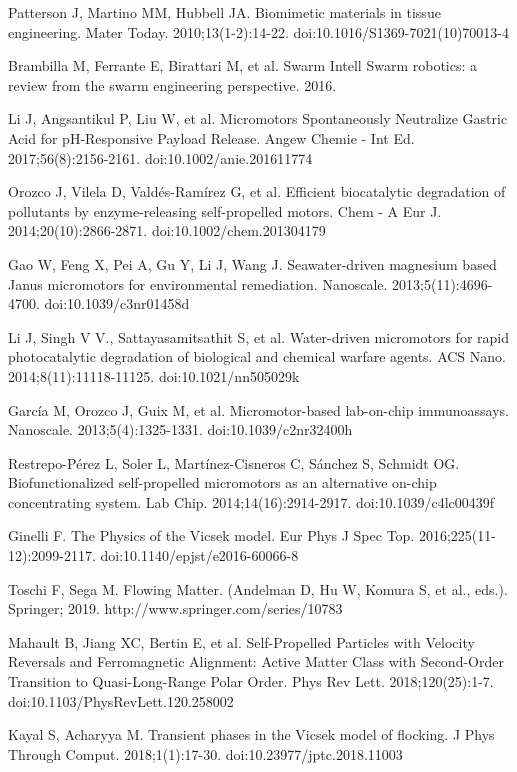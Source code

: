 \documentclass[11pt]{article}
\begin{document}
\begin{thebibliography}{9}
Patterson J, Martino MM, Hubbell JA. Biomimetic materials in tissue engineering. Mater Today. 2010;13(1-2):14-22. doi:10.1016/S1369-7021(10)70013-4

Brambilla M, Ferrante E, Birattari M, et al. Swarm Intell Swarm robotics: a review from the swarm engineering perspective. 2016.

Li J, Angsantikul P, Liu W, et al. Micromotors Spontaneously Neutralize Gastric Acid for pH-Responsive Payload Release. Angew Chemie - Int Ed. 2017;56(8):2156-2161. doi:10.1002/anie.201611774

Orozco J, Vilela D, Valdés-Ramírez G, et al. Efficient biocatalytic degradation of pollutants by enzyme-releasing self-propelled motors. Chem - A Eur J. 2014;20(10):2866-2871. doi:10.1002/chem.201304179

Gao W, Feng X, Pei A, Gu Y, Li J, Wang J. Seawater-driven magnesium based Janus micromotors for environmental remediation. Nanoscale. 2013;5(11):4696-4700. doi:10.1039/c3nr01458d

Li J, Singh V V., Sattayasamitsathit S, et al. Water-driven micromotors for rapid photocatalytic degradation of biological and chemical warfare agents. ACS Nano. 2014;8(11):11118-11125. doi:10.1021/nn505029k

García M, Orozco J, Guix M, et al. Micromotor-based lab-on-chip immunoassays. Nanoscale. 2013;5(4):1325-1331. doi:10.1039/c2nr32400h

Restrepo-Pérez L, Soler L, Martínez-Cisneros C, Sánchez S, Schmidt OG. Biofunctionalized self-propelled micromotors as an alternative on-chip concentrating system. Lab Chip. 2014;14(16):2914-2917. doi:10.1039/c4lc00439f

Ginelli F. The Physics of the Vicsek model. Eur Phys J Spec Top. 2016;225(11-12):2099-2117. doi:10.1140/epjst/e2016-60066-8

Toschi F, Sega M. Flowing Matter. (Andelman D, Hu W, Komura S, et al., eds.). Springer; 2019. http://www.springer.com/series/10783

Mahault B, Jiang XC, Bertin E, et al. Self-Propelled Particles with Velocity Reversals and Ferromagnetic Alignment: Active Matter Class with Second-Order Transition to Quasi-Long-Range Polar Order. Phys Rev Lett. 2018;120(25):1-7. doi:10.1103/PhysRevLett.120.258002

Kayal S, Acharyya M. Transient phases in the Vicsek model of flocking. J Phys Through Comput. 2018;1(1):17-30. doi:10.23977/jptc.2018.11003


\end{thebibliography}
\end{document}
